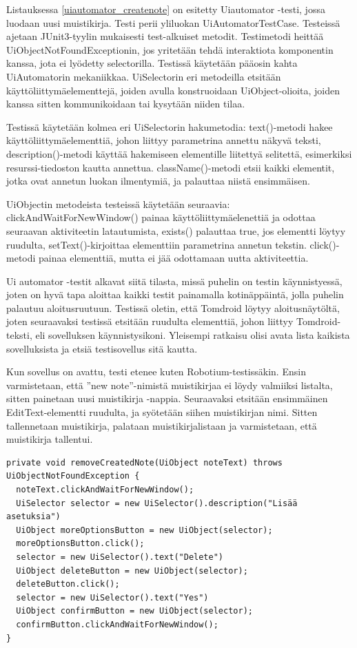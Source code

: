 Listauksessa \ref{uiautomator_createnote} on esitetty Uiautomator -testi, jossa luodaan uusi muistikirja. Testi perii yliluokan UiAutomatorTestCase. Testeissä ajetaan JUnit3-tyylin mukaisesti test-alkuiset metodit. Testimetodi heittää UiObjectNotFoundExceptionin, jos yritetään tehdä interaktiota komponentin kanssa, jota ei lyödetty selectorilla. Testissä käytetään pääosin kahta UiAutomatorin mekaniikkaa. UiSelectorin eri metodeilla etsitään käyttöliittymäelementtejä, joiden avulla konstruoidaan UiObject-olioita, joiden kanssa sitten kommunikoidaan tai kysytään niiden tilaa. 

Testissä käytetään kolmea eri UiSelectorin hakumetodia: text()-metodi hakee käyttöliittymäelementtiä, johon liittyy parametrina annettu näkyvä teksti, description()-metodi käyttää hakemiseen elementille liitettyä selitettä, esimerkiksi resurssi-tiedoston kautta annettua. className()-metodi etsii kaikki elementit, jotka ovat annetun luokan ilmentymiä, ja palauttaa niistä ensimmäisen.

UiObjectin metodeista testeissä käytetään seuraavia: clickAndWaitForNewWindow() painaa käyttöliittymäelenettiä ja odottaa seuraavan aktiviteetin latautumista, exists() palauttaa true, jos elementti löytyy ruudulta, setText()-kirjoittaa elementtiin parametrina annetun tekstin. click()-metodi painaa elementtiä, mutta ei jää odottamaan uutta aktiviteettia.

Ui automator -testit alkavat siitä tilasta, missä puhelin on testin käynnistyessä, joten on hyvä tapa aloittaa kaikki testit painamalla kotinäppäintä, jolla puhelin palautuu aloitusruutuun. Testissä oletin, että Tomdroid löytyy aloitusnäytöltä, joten seuraavaksi testissä etsitään ruudulta elementtiä, johon liittyy Tomdroid-teksti, eli sovelluksen käynnistysikoni. Yleisempi ratkaisu olisi avata lista kaikista sovelluksista ja etsiä testisovellus sitä kautta.

Kun sovellus on avattu, testi etenee kuten Robotium-testissäkin. Ensin varmistetaan, että ''new note''-nimistä muistikirjaa ei löydy valmiiksi listalta, sitten painetaan uusi muistikirja -nappia. Seuraavaksi etsitään ensimmäinen EditText-elementti ruudulta, ja syötetään siihen muistikirjan nimi. Sitten tallennetaan muistikirja, palataan muistikirjalistaan ja varmistetaan, että muistikirja tallentui.

\begin{lstlisting}[float,label=uiautomator_teardown,caption=Luodun muistikirjan poisto Uiautomatorilla] 
private void removeCreatedNote(UiObject noteText) throws UiObjectNotFoundException {
  noteText.clickAndWaitForNewWindow();
  UiSelector selector = new UiSelector().description("Lisää asetuksia")
  UiObject moreOptionsButton = new UiObject(selector);
  moreOptionsButton.click();
  selector = new UiSelector().text("Delete")
  UiObject deleteButton = new UiObject(selector);
  deleteButton.click();
  selector = new UiSelector().text("Yes")
  UiObject confirmButton = new UiObject(selector);
  confirmButton.clickAndWaitForNewWindow();
}
\end{lstlisting}

